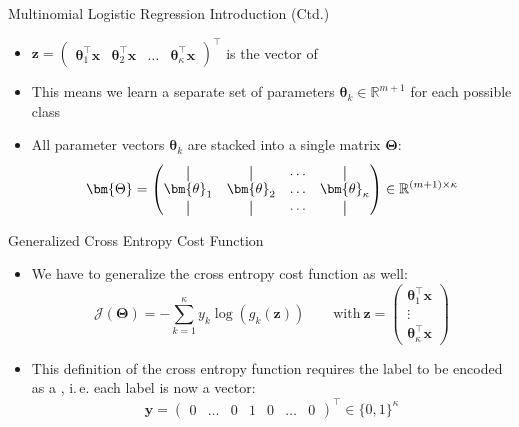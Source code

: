 \begin{frame}{Multinomial Logistic Regression Introduction (Ctd.)}{}\optional
	\begin{itemize}
		\item $\bm{z} = \begin{pmatrix}
			\bm{\theta}_{1}^{\intercal} \bm{x} &
			\bm{\theta}_{2}^{\intercal} \bm{x} &
			\hdots &
			\bm{\theta}_{\kappa}^{\intercal} \bm{x}
		\end{pmatrix}^{\intercal}$ is the vector of 
		\item This means we learn a separate set of parameters $\bm{\theta}_k \in \mathbb{R}^{m+1}$ for each possible class
		\item All parameter vectors $\bm{\theta}_k$ are stacked into a single matrix $\bm{\Theta}$:
		\begin{equation}
			\bm{\Theta} = \begin{pmatrix}
				\vertbar 			& \vertbar			& \hdots 			& \vertbar 				\\
				\bm{\theta}_1 		& \bm{\theta}_2 	& \hdots 			& \bm{\theta}_{\kappa}	\\
				\vertbar 			& \vertbar			& \hdots 			& \vertbar
			\end{pmatrix} \in \mathbb{R}^{(m+1) \times \kappa}
		\end{equation}
	\end{itemize}
\end{frame}


\begin{frame}{Generalized Cross Entropy Cost Function}{}\optional
	\begin{itemize}
		\item We have to generalize the cross entropy cost function as well:
		\begin{equation}
			\mathcal{J}(\bm{\Theta}) = -\sum_{k=1}^{\kappa} y_k \log(g_k(\bm{z})) \qquad \text{with}\ \bm{z} =
			\begin{pmatrix}
				\bm{\theta}_{1}^{\intercal} \bm{x} \\
				\vdots \\
				\bm{\theta}_{\kappa}^{\intercal} \bm{x}
			\end{pmatrix}
		\end{equation}
		\item This definition of the cross entropy function requires the label to be encoded as a , i.\,e. each label is now a vector:
		\begin{equation}
			\bm{y} = \begin{pmatrix} 0 & \hdots & 0 & 1 & 0 & \hdots & 0\end{pmatrix}^{\intercal} \in \{ 0, 1 \}^{\kappa}
		\end{equation}
	\end{itemize}
\end{frame}


